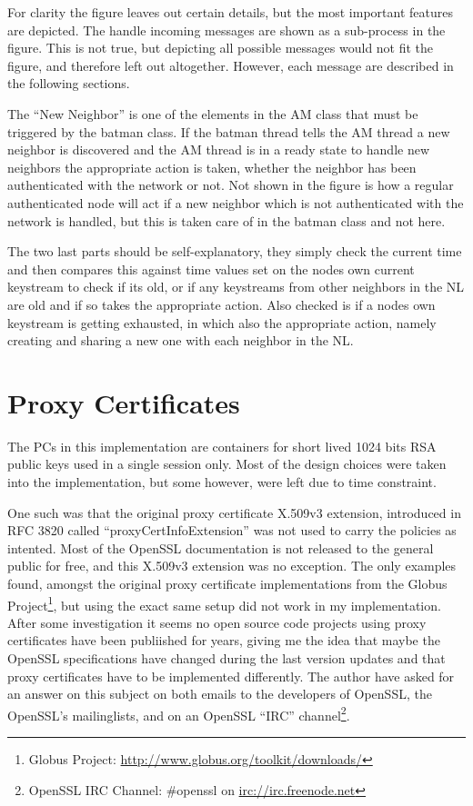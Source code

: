 For clarity the figure leaves out certain details, but the most important
features are depicted. The handle incoming messages are shown as a sub-process
in the figure.  This is not true, but depicting all possible messages would not
fit the figure, and therefore left out altogether. However, each message are
described in the following sections.

The ``New Neighbor'' is one of the elements in the AM class that must be
triggered by the batman class. If the batman thread tells the AM thread a new
neighbor is discovered and the AM thread is in a ready state to handle new
neighbors the appropriate action is taken, whether the neighbor has been
authenticated with the network or not. Not shown in the figure is how a regular
authenticated node will act if a new neighbor which is not authenticated with
the network is handled, but this is taken care of in the batman class and not
here.

The two last parts should be self-explanatory, they simply check the current
time and then compares this against time values set on the nodes own current
keystream to check if its old, or if any keystreams from other neighbors in the
\ac{NL} are old and if so takes the appropriate action. Also checked is if a
nodes own keystream is getting exhausted, in which also the appropriate action,
namely creating and sharing a new one with each neighbor in the \ac{NL}.


\section{Proxy Certificates}
The \acp{PC} in this implementation are containers for short lived 1024 bits RSA
public keys used in a single session only. Most of the design choices were taken
into the implementation, but some however, were left due to time constraint.

One such was that the original proxy certificate X.509v3 extension, introduced
in RFC 3820 called ``proxyCertInfoExtension'' was not used to carry the policies as
intented. Most of the OpenSSL documentation is not released to the general
public for free, and this X.509v3 extension was no exception. The only examples
found, amongst the original proxy certificate implementations from the Globus
Project\footnote{Globus Project:
\url{http://www.globus.org/toolkit/downloads/}}, but using the exact same setup
did not work in my implementation. After some investigation it seems no open
source code projects using proxy certificates have been publiished for years,
giving me the idea that maybe the OpenSSL specifications have changed during
the last version updates and that proxy certificates have to be implemented
differently. The author have asked for an answer on this subject on both emails
to the developers of OpenSSL, the OpenSSL's mailinglists, and on an
OpenSSL ``IRC'' channel\footnote{OpenSSL IRC Channel: \#openssl on
\url{irc://irc.freenode.net}}.

